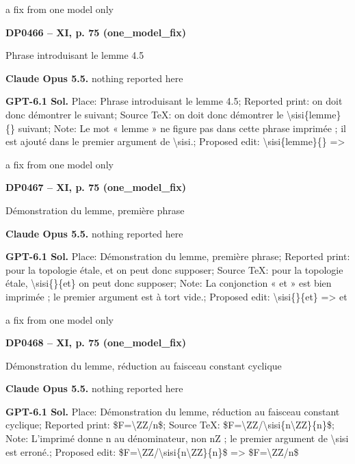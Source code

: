a fix from one model only\par
\par\noindent\hypertarget{DP0466}{}\textbf{DP0466 -- XI, p. 75 (one\_model\_fix)}\par
Phrase introduisant le lemme 4.5\par
\textbf{Claude Opus 5.5.} nothing reported here\par
\textbf{GPT-6.1 Sol.} Place: Phrase introduisant le lemme 4.5; Reported print: on doit donc démontrer le suivant; Source TeX: on doit donc démontrer le \textbackslash{}sisi\{lemme\}\{\} suivant; Note: Le mot « lemme » ne figure pas dans cette phrase imprimée ; il est ajouté dans le premier argument de \textbackslash{}sisi.; Proposed edit: \textbackslash{}sisi\{lemme\}\{\} =\allowbreak > \par
a fix from one model only\par
\par\noindent\hypertarget{DP0467}{}\textbf{DP0467 -- XI, p. 75 (one\_model\_fix)}\par
Démonstration du lemme, première phrase\par
\textbf{Claude Opus 5.5.} nothing reported here\par
\textbf{GPT-6.1 Sol.} Place: Démonstration du lemme, première phrase; Reported print: pour la topologie étale, et on peut donc supposer; Source TeX: pour la topologie étale, \textbackslash{}sisi\{\}\{et\} on peut donc supposer; Note: La conjonction « et » est bien imprimée ; le premier argument est à tort vide.; Proposed edit: \textbackslash{}sisi\{\}\{et\} =\allowbreak > et\par
a fix from one model only\par
\par\noindent\hypertarget{DP0468}{}\textbf{DP0468 -- XI, p. 75 (one\_model\_fix)}\par
Démonstration du lemme, réduction au faisceau constant cyclique\par
\textbf{Claude Opus 5.5.} nothing reported here\par
\textbf{GPT-6.1 Sol.} Place: Démonstration du lemme, réduction au faisceau constant cyclique; Reported print: \$F=\allowbreak \textbackslash{}ZZ/n\$; Source TeX: \$F=\allowbreak \textbackslash{}ZZ/\textbackslash{}sisi\{n\textbackslash{}ZZ\}\{n\}\$; Note: L'imprimé donne n au dénominateur, non nZ ; le premier argument de \textbackslash{}sisi est erroné.; Proposed edit: \$F=\allowbreak \textbackslash{}ZZ/\textbackslash{}sisi\{n\textbackslash{}ZZ\}\{n\}\$ =\allowbreak > \$F=\allowbreak \textbackslash{}ZZ/n\$\par
